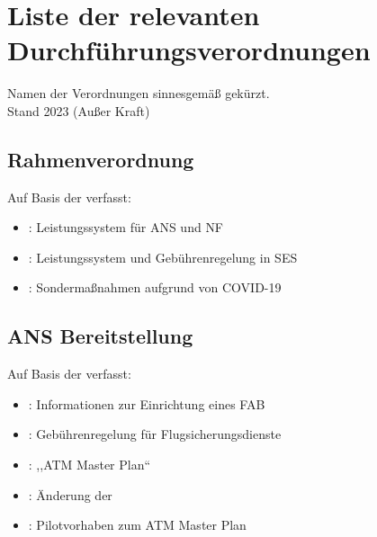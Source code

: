 \chapter{Liste der relevanten Durchführungsverordnungen}
\label{extra_implementing_regulations}

\begin{center}
    \footnotesize
    Namen der Verordnungen sinnesgemäß gekürzt. \\
    Stand 2023 (\textdagger Außer Kraft)
\end{center}

\section{Rahmenverordnung}

    Auf Basis der  verfasst:

    \begin{itemize}
        \item {}\textdagger: Leistungssystem für \acs{ANS} und \acs{NF}
        \item {}: Leistungssystem und Gebührenregelung in \ac{SES}
        \item {}: Sondermaßnahmen aufgrund von COVID-19 
    \end{itemize}

\section{ANS Bereitstellung} 
    Auf Basis der  verfasst:

    \begin{itemize}
        \item {}: Informationen zur Einrichtung eines \acs{FAB}
        \item {}\textdagger: Gebührenregelung für Flugsicherungsdienste
        \item {}: ,,\acs{ATM} Master Plan``
        \item {}\textdagger: Änderung der 
        \item {}\textdagger: Pilotvorhaben zum \acs{ATM} Master Plan
    \end{itemize}

